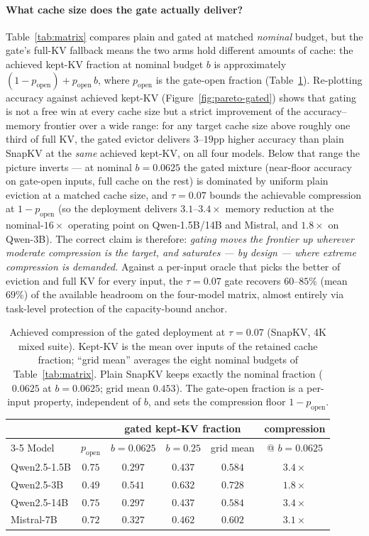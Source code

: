 \paragraph{What cache size does the gate actually deliver?}
Table~\ref{tab:matrix} compares plain and gated at matched \emph{nominal}
budget, but the gate's full-KV fallback means the two arms hold different
amounts of cache: the achieved kept-KV fraction at nominal budget $b$ is
approximately $(1-p_{\text{open}}) + p_{\text{open}}\,b$, where
$p_{\text{open}}$ is the gate-open fraction
(Table~\ref{tab:achieved-compression}). Re-plotting accuracy against achieved
kept-KV (Figure~\ref{fig:pareto-gated}) shows that gating is not a free win at
every cache size but a strict improvement of the accuracy--memory frontier over
a wide range: for any target cache size above roughly one third of full KV, the
gated evictor delivers $3$--$19$pp higher accuracy than plain SnapKV at the
\emph{same} achieved kept-KV, on all four models. Below that range the picture
inverts --- at nominal $b=0.0625$ the gated mixture (near-floor accuracy on
gate-open inputs, full cache on the rest) is dominated by uniform plain
eviction at a matched cache size, and $\tau=0.07$ bounds the achievable
compression at $1-p_{\text{open}}$ (so the deployment delivers
$3.1$--$3.4\times$ memory reduction at the nominal-$16\times$ operating point
on Qwen-1.5B/14B and Mistral, and $1.8\times$ on Qwen-3B). The correct claim is
therefore: \emph{gating moves the frontier up wherever moderate compression is
the target, and saturates --- by design --- where extreme compression is
demanded.} Against a per-input oracle that picks the better of eviction and
full KV for every input, the $\tau=0.07$ gate recovers $60$--$85\%$ (mean
$69\%$) of the available headroom on the four-model matrix, almost entirely via
task-level protection of the capacity-bound anchor.

\begin{table}[t]
\centering
\caption{Achieved compression of the gated deployment at $\tau=0.07$ (SnapKV,
4K mixed suite). Kept-KV is the mean over inputs of the retained cache
fraction; ``grid mean'' averages the eight nominal budgets of
Table~\ref{tab:matrix}. Plain SnapKV keeps exactly the nominal fraction
($0.0625$ at $b=0.0625$; grid mean $0.453$). The gate-open fraction is a
per-input property, independent of $b$, and sets the compression floor
$1-p_{\text{open}}$.}
\label{tab:achieved-compression}
\begin{tabular}{lccccc}
\toprule
 & & \multicolumn{3}{c}{gated kept-KV fraction} & compression \\
\cmidrule(lr){3-5}
Model & $p_{\text{open}}$ & $b{=}0.0625$ & $b{=}0.25$ & grid mean & @ $b{=}0.0625$ \\
\midrule
Qwen2.5-1.5B & $0.75$ & $0.297$ & $0.437$ & $0.584$ & $3.4\times$ \\
Qwen2.5-3B   & $0.49$ & $0.541$ & $0.632$ & $0.728$ & $1.8\times$ \\
Qwen2.5-14B  & $0.75$ & $0.297$ & $0.437$ & $0.584$ & $3.4\times$ \\
Mistral-7B   & $0.72$ & $0.327$ & $0.462$ & $0.602$ & $3.1\times$ \\
\bottomrule
\end{tabular}
\end{table}
